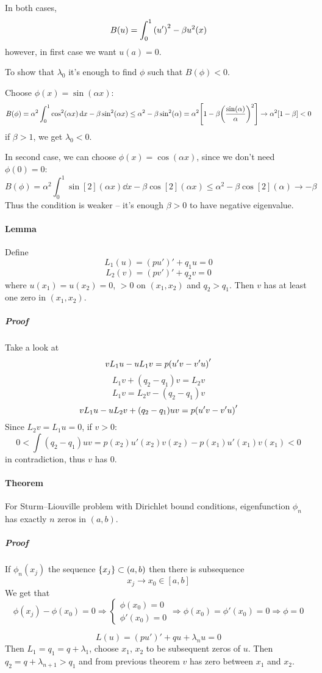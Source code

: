 In both cases, 
$$B(u) = \int_0^1 \qty(u')^2 - \beta u^2(x)$$
however, in first case we want $u(a) = 0$.

To show that $\lambda_0$ it's enough to find $\phi$ such that $B(\phi)<0$.

Choose $\phi(x) = \sin(\alpha x)$:
$$B(\phi)  = \alpha^2 \int_0^1 \cos[2](\alpha x) \dd{x} - \beta \sin[2](\alpha x) \leq \alpha^2 - \beta\sin[2](\alpha ) = \alpha^2 \qty[1- \beta\qty(\frac{\sin(\alpha ) }{\alpha})^2] \to\alpha^2 \qty[1- \beta] < 0$$
if $\beta > 1$, we get $\lambda_0<0$.

In second case, we can choose $\phi(x) = \cos(\alpha x)$, since we don't need $\phi(0)=0$:
$$B(\phi)  = \alpha^2 \int_0^1 \sin[2](\alpha x) \dd{x} - \beta \cos[2](\alpha x) \leq \alpha^2 - \beta\cos[2](\alpha ) \to -\beta$$
Thus the condition is weaker -- it's enough $\beta>0$ to have negative eigenvalue.
\paragraph{Lemma}
Define
$$L_1(u) = (pu')' + q_1u = 0$$
$$L_2(v) = (pv')' + q_2v = 0$$
where
$u(x_1)=u(x_2) = 0$, $>0$ on $(x_1,x_2)$ and $q_2>q_1$. Then $v$ has at least one zero in $(x_1,x_2)$.
\subparagraph{Proof}
Take a look at
$$vL_1u - uL_1v = p\qty(u'v-v'u)'$$
$$L_1v + (q_2-q_1)v  = L_2v$$
$$L_1v   = L_2v -  (q_2-q_1)v$$
$$vL_1u - uL_2v + (q_2-q_1)uv = p\qty(u'v-v'u)'$$
Since $L_2 v = L_1 u = 0$, if $v>0$:
$$0<\int (q_2-q_1)uv = p(x_2)u'(x_2)v(x_2)-p(x_1)u'(x_1)v(x_1)<0$$
in contradiction, thus $v$ has $0$.

\paragraph{Theorem}
For Sturm–Liouville problem with Dirichlet bound conditions, eigenfunction $\phi_n$  has exactly $n$ zeros in $(a,b)$.
\subparagraph{Proof}
If $\phi_n(x_j)$ the sequence $\qty{x_j}\subset (a,b)$ then there is subsequence
$$x_j \to x_0 \in [a,b]$$
We get that
$$\phi(x_j) - \phi(x_0) = 0 \Rightarrow \begin{cases}
\phi(x_0) = 0\\\phi'(x_0)= 0 
\end{cases} \Rightarrow \phi(x_0) = \phi'(x_0) = 0 \Rightarrow \phi = 0$$


$$L(u) = (pu')'+qu+\lambda_nu  =0 $$
Then $L_1  =q_1= q +\lambda_1$, choose $x_1$, $x_2$ to be subsequent zeros of $u$. Then $q_2 = q+\lambda_{n+1} > q_1$ and from previous theorem $v$ has zero between $x_1$ and $x_2$.

